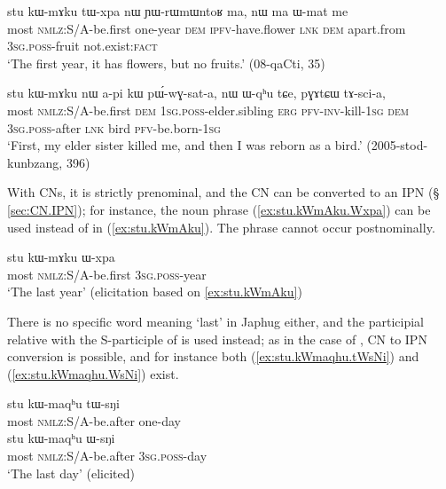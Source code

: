 \begin{exe}
\ex  \label{ex:stu.kWmAku}
\gll stu kɯ-mɤku tɯ-xpa nɯ ɲɯ-rɯmɯntoʁ ma, nɯ ma ɯ-mat me \\
most \textsc{nmlz}:S/A-be.first one-year \textsc{dem} \textsc{ipfv}-have.flower \textsc{lnk} \textsc{dem} apart.from \textsc{3sg}.\textsc{poss}-fruit not.exist:\textsc{fact} \\
\glt `The first year, it has flowers, but no fruits.' (08-qaCti, 35)
\end{exe}
  
\begin{exe}
\ex  \label{ex:stu.kWmAku2}
\gll stu kɯ-mɤku nɯ a-pi kɯ pɯ́-wɣ-sat-a,  nɯ ɯ-qʰu tɕe, pɣɤtɕɯ tɤ-sci-a, \\
most \textsc{nmlz}:S/A-be.first \textsc{dem} \textsc{1sg}.\textsc{poss}-elder.sibling \textsc{erg} \textsc{pfv}-\textsc{inv}-kill-\textsc{1sg} \textsc{dem} \textsc{3sg}.\textsc{poss}-after \textsc{lnk} bird \textsc{pfv}-be.born-\textsc{1sg} \\
\glt `First, my elder sister killed me, and then I was reborn as a bird.' (2005-stod-kunbzang, 396)
\end{exe}

With CNs, it is strictly prenominal, and the CN can be converted to an IPN (§ \ref{sec:CN.IPN}); for instance, the noun phrase (\ref{ex:stu.kWmAku.Wxpa}) can be used instead of  in (\ref{ex:stu.kWmAku}). The phrase  cannot occur postnominally.

\begin{exe}
\ex  \label{ex:stu.kWmAku.Wxpa}
\gll  stu kɯ-mɤku ɯ-xpa \\
 most \textsc{nmlz}:S/A-be.first \textsc{3sg}.\textsc{poss}-year  \\
\glt  `The last year' (elicitation based on \ref{ex:stu.kWmAku})
\end{exe}

There is no specific word meaning `last' in Japhug either, and the participial relative   with the S-participle of  is used instead; as in the case of , CN to IPN conversion is possible, and for instance both (\ref{ex:stu.kWmaqhu.tWsNi}) and (\ref{ex:stu.kWmaqhu.WsNi}) exist.

\begin{exe}
\ex \label{ex:stu.kWmaqhu.tWsNi}
\gll  stu kɯ-maqʰu tɯ-sŋi  \\
 most \textsc{nmlz}:S/A-be.after one-day \\
 \ex \label{ex:stu.kWmaqhu.WsNi}
\gll  stu kɯ-maqʰu ɯ-sŋi  \\
 most \textsc{nmlz}:S/A-be.after \textsc{3sg}.\textsc{poss}-day \\
\glt `The last day' (elicited)
\end{exe}

